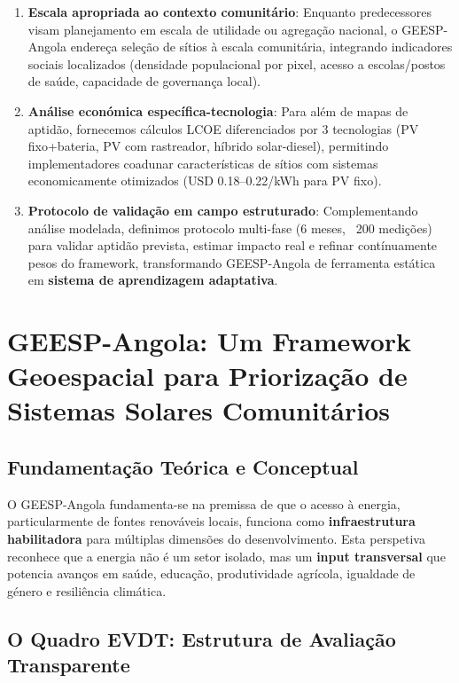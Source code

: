 \documentclass[12pt, a4paper]{article}
\begin{document}
\begin{enumerate}
\item \textbf{Escala apropriada ao contexto comunitário}: Enquanto predecessores visam planejamento em escala de utilidade ou agregação nacional, o GEESP-Angola endereça seleção de sítios à escala comunitária, integrando indicadores sociais localizados (densidade populacional por pixel, acesso a escolas/postos de saúde, capacidade de governança local).

\item \textbf{Análise económica específica-tecnologia}: Para além de mapas de aptidão, fornecemos cálculos LCOE diferenciados por 3 tecnologias (PV fixo+bateria, PV com rastreador, híbrido solar-diesel), permitindo implementadores coadunar características de sítios com sistemas economicamente otimizados (USD 0.18--0.22/kWh para PV fixo).

\item \textbf{Protocolo de validação em campo estruturado}: Complementando análise modelada, definimos protocolo multi-fase (6 meses, ~200 medições) para validar aptidão prevista, estimar impacto real e refinar contínuamente pesos do framework, transformando GEESP-Angola de ferramenta estática em \textbf{sistema de aprendizagem adaptativa}.
\end{enumerate}

\section{GEESP-Angola: Um Framework Geoespacial para Priorização de Sistemas Solares Comunitários}

\subsection{Fundamentação Teórica e Conceptual}

O GEESP-Angola fundamenta-se na premissa de que o acesso à energia, particularmente de fontes renováveis locais, funciona como \textbf{infraestrutura habilitadora} para múltiplas dimensões do desenvolvimento. Esta perspetiva reconhece que a energia não é um setor isolado, mas um \textbf{input transversal} que potencia avanços em saúde, educação, produtividade agrícola, igualdade de género e resiliência climática.

\subsection{O Quadro EVDT: Estrutura de Avaliação Transparente}
\end{document}
